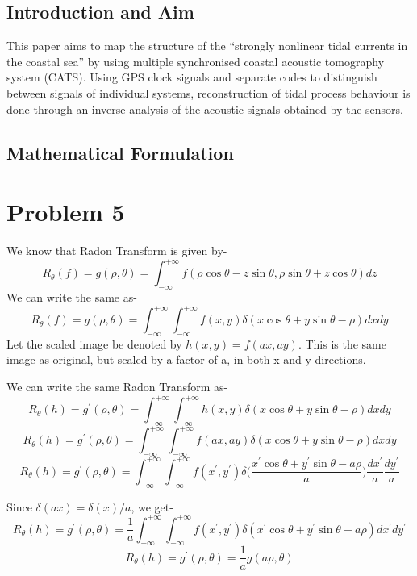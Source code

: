 \documentclass[a4paper,11pt]{article}
\numberwithin{definition}{section}
\numberwithin{mytheorem}{subsection}
\begin{document}
\subsection{Introduction and Aim}

This paper aims to map the structure of the ``strongly
nonlinear tidal currents in the coastal sea'' by using multiple synchronised coastal acoustic tomography system (CATS). Using GPS clock signals and separate codes to distinguish between signals of individual systems, reconstruction of tidal process behaviour is done through an inverse analysis of the acoustic signals obtained by the sensors.

\subsection{Mathematical Formulation}


\section{Problem 5}

We know that Radon Transform is given by-
$$R_\theta(f) =g(\rho, \theta)= \int_{-\infty}^{+\infty}f(\rho\cos\theta - z\sin\theta,\rho\sin \theta + z\cos\theta)dz $$
We can write the same as-
$$R_\theta(f) =g(\rho, \theta)= \int_{-\infty}^{+\infty}\int_{-\infty}^{+\infty}f(x,y)\delta(x\cos\theta+y\sin\theta -\rho)dxdy $$
Let the scaled image be denoted by $h(x,y) = f(ax, ay)$. This is the same image as original, but scaled by a factor of a, in both x and y directions.

We can write the same Radon Transform as-
$$ R_\theta(h) =g^{\prime}(\rho, \theta)= \int_{-\infty}^{+\infty}\int_{-\infty}^{+\infty}h(x,y)\delta(x\cos\theta+y\sin\theta -\rho)dxdy $$
$$ R_\theta(h) =g^{\prime}(\rho, \theta)= \int_{-\infty}^{+\infty}\int_{-\infty}^{+\infty}f(ax,ay)\delta(x\cos\theta+y\sin\theta -\rho)dxdy $$
$$ R_\theta(h) =g^{\prime}(\rho, \theta)= \int_{-\infty}^{+\infty}\int_{-\infty}^{+\infty}f(x^{\prime},y^{\prime})\delta\bigg(\frac{x^{\prime}\cos\theta+y^{\prime}\sin\theta -a\rho}{a}\bigg)\frac{dx^{\prime}}{a}\frac{dy^{\prime}}{a} $$

Since $\delta(ax) = \delta(x)/a$, we get-
$$ R_\theta(h) =g^{\prime}(\rho, \theta)= \frac{1}{a}\int_{-\infty}^{+\infty}\int_{-\infty}^{+\infty}f(x^{\prime},y^{\prime})\delta(x^{\prime}\cos\theta+y^{\prime}\sin\theta -a\rho)dx^{\prime}dy^{\prime} $$
$$ R_\theta(h) =g^{\prime}(\rho, \theta)= \frac{1}{a}g(a\rho, \theta) $$
\end{document}
